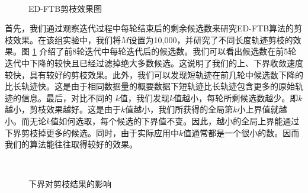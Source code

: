 \begin{figure}[t]
	\centering
		\centering
	\\
		\caption{ED-FTB剪枝效果图}
		\label{fig:ED-DTKTS}
\end{figure}
首先，我们通过观察迭代过程中每轮结束后的剩余候选数来研究ED-FTB算法的剪枝效果。在该组实验中，我们将$M$设置为10,000，并研究了不同长度轨迹剪枝的效果。图 \ref{fig:ED-DTKTS} 介绍了前8轮迭代中每轮迭代后的候选数。我们可以看出候选数在前5轮迭代中下降的较快且已经过滤掉绝大多数候选。这说明了我们的上、下界收敛速度较快，具有较好的剪枝效果。此外，我们可以发现短轨迹在前几轮中候选数下降的比长轨迹快。这是由于相同数据量的概要数据下短轨迹比长轨迹包含更多的原始轨迹的信息。最后，对比不同的 $k$值，我们发现$k$值越小，每轮所剩候选数越少。即$k$越小，剪枝效果越好。这是由于$k$值越小，我们所获得的全局第$k$小上界值就越小。而无论$k$值如何选取，每个候选的下界值不变。因此，越小的全局上界能通过下界剪枝掉更多的候选。同时，由于实际应用中$k$值通常都是一个很小的数。因而我们的算法能往往取得较好的效果。
\begin{figure}
		\centering
\\
	\caption{下界对剪枝结果的影响}
	\label{fig:PruningCmp}
\end{figure}

